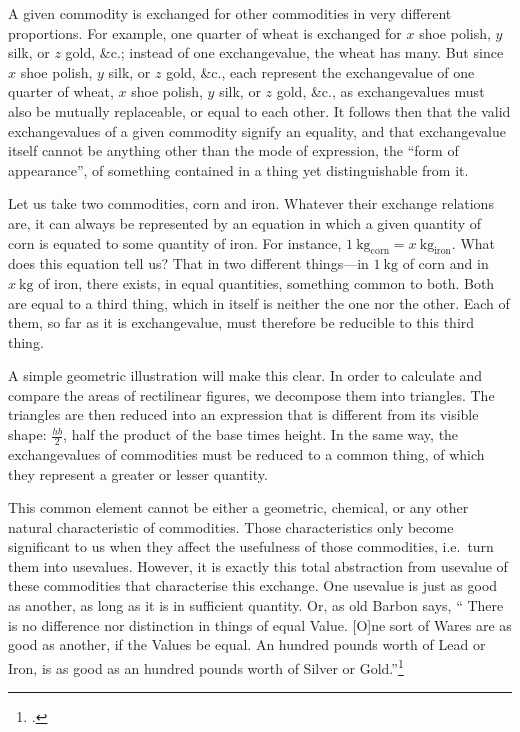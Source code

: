 A given commodity 
is exchanged for other commodities 
in very different proportions.
For example, 
one quarter of wheat 
is exchanged for 
\(x\) shoe polish,
\(y\) silk,
or \(z\) gold, \&c.;
instead of one exchangevalue,
the wheat has many.
But since 
\(x\) shoe polish,
\(y\) silk,
or \(z\) gold, \&c.,
each represent the exchangevalue of 
one quarter of wheat,
\(x\) shoe polish,
\(y\) silk,
or \(z\) gold, \&c.,
as exchangevalues must also be mutually replaceable,
or equal to each other.
It follows then that
the valid exchangevalues of a given commodity 
signify an equality, and that
exchangevalue itself cannot be anything other than the mode of expression,
the \enquote{form of appearance},
of something contained in a thing yet distinguishable from it.

Let us take two commodities, corn and iron. 
Whatever their exchange relations are,
it can always be represented 
by an equation in which 
a given quantity of corn is equated to some quantity of iron.
For instance, \(1\:\mathrm{kg}_{\mathrm{corn}} = x\:\mathrm{kg}_{\mathrm{iron}}.\)
What does this equation tell us?
That in two different things---in
\(1\:\mathrm{kg}\) of corn and in \(x\:\mathrm{kg}\) of iron, 
there exists, in equal quantities, something common to both.
Both are equal to a third thing, 
which in itself is neither
the one nor the other. 
Each of them, 
so far as it is exchangevalue, 
must therefore be reducible to this third thing.

A simple geometric illustration will make this clear.
In order to calculate and compare
the areas of rectilinear figures,
we decompose them into triangles.
The triangles are then reduced into an expression that is 
different from its visible shape:
\(\frac{hb}{2}\),
half the product of the base times height.
In the same way,
the exchangevalues of commodities 
must be reduced to a common thing, 
of which they represent a greater or lesser quantity.

This common element cannot be either a geometric,
chemical, or any other natural characteristic of commodities.
Those characteristics only become significant to us 
when they affect the usefulness of those commodities,
i.e.~turn them into usevalues.
However, it is exactly this total abstraction 
from usevalue of these commodities 
that characterise this exchange.
One usevalue is just as good as another, 
as long as it is in sufficient quantity.
Or, as old Barbon says, 
\enquote{%
There is no difference nor distinction 
in things of equal Value.
\textelp{}
[O]ne sort of Wares are as good as another,
if the Values be equal. An hundred pounds worth of Lead
or Iron, is as good as an hundred pounds
worth of Silver or Gold.}\footcite[7, 53]{fn02}

